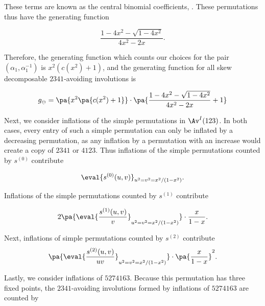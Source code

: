 \documentclass[12pt,twoside]{memoir}
\begin{document}
      These terms are known as the central binomial coefficients,
      . These permutations thus have the generating function

      $$ \frac{1-4x^2-\sqrt{1-4x^2}}{4x^2-2x}. $$

      Therefore, the generating function which counts our choices for the pair
      $(\alpha_1,\alpha_1^{-1})$ is $x^2(c(x^2)+1)$, and the generating function for
      all skew decomposable $2341$-avoiding involutions is

      \begin{equation}
      \label{involutions:eqn:2341-2}
        g_\ominus
        =
        \pa{x^2\pa{c(x^2)+1}}
        \cdot
        \pa{\frac{1-4x^2-\sqrt{1-4x^2}}{4x^2-2x}+1}
      \end{equation}

      Next, we consider inflations of the simple permutations in $\Av^I(123)$. In
      both cases, every entry of such a simple permutation can only be inflated by a
      decreasing permutation, as any inflation by a permutation with an increase
      would create a copy of $2341$ or $4123$. Thus inflations of the simple
      permutations counted by $s^{(0)}$ contribute

      \begin{equation}
      \label{involutions:eqn:2341-3}
        \eval{s^{(0)}(u,v)}_{u^2=v^2=x^2/(1-x^2)}.
      \end{equation}

      Inflations of the simple permutations counted by $s^{(1)}$ contribute

      \begin{equation}
        \label{involutions:eqn:2341-4}
        2\pa{\eval{\frac{s^{(1)}(u,v)}{v}}_{u^2=v^2=x^2/(1-x^2)}}
        \cdot
        \frac{x}{1-x}.
      \end{equation}

      Next, inflations of simple permutations counted by $s^{(2)}$ contribute
        \begin{equation}
        \label{involutions:eqn:2341-5}
        \pa{\eval{\frac{s^{(2)}(u,v)}{uv}}_{u^2=v^2=x^2/(1-x^2)}}
        \cdot
        \pa{\frac{x}{1-x}}^2.
      \end{equation}


      Lastly, we consider inflations of $5274163$. Because this permutation has
      three fixed points, the $2341$-avoiding involutions formed by inflations of
      $5274163$ are counted by
\end{document}
